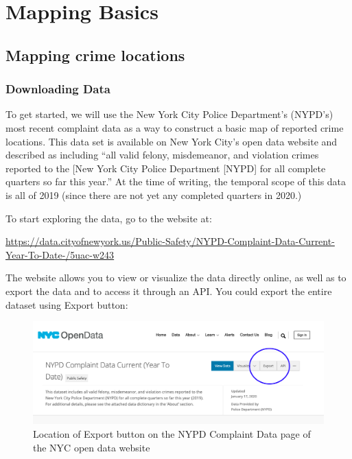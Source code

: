 \documentclass[]{book}
\begin{document}
\hypertarget{mapping-basics}{%
\chapter{Mapping Basics}\label{mapping-basics}}

\hypertarget{mapping-crime-locations}{%
\section{Mapping crime locations}\label{mapping-crime-locations}}

\hypertarget{downloading-data}{%
\subsection{Downloading Data}\label{downloading-data}}

To get started, we will use the New York City Police Department's (NYPD's) most recent complaint data as a way to construct a basic map of reported crime locations. This data set is available on New York City's open data website and described as including ``all valid felony, misdemeanor, and violation crimes reported to the {[}New York City Police Department {[}NYPD{]} for all complete quarters so far this year.'' At the time of writing, the temporal scope of this data is all of 2019 (since there are not yet any completed quarters in 2020.)

To start exploring the data, go to the website at:

\url{https://data.cityofnewyork.us/Public-Safety/NYPD-Complaint-Data-Current-Year-To-Date-/5uac-w243}

The website allows you to view or visualize the data directly online, as well as to export the data and to access it through an API. You could export the entire dataset using Export button:

\begin{figure}
\centering
\includegraphics{images/NYPD_CD_main.png}
\caption{Location of Export button on the NYPD Complaint Data page of the NYC open data website}
\end{figure}
\end{document}
